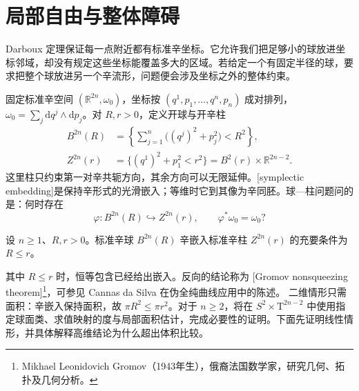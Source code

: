 
% 
% 
% 

\section{局部自由与整体障碍}
\label{g4:sec:0805}

Darboux 定理保证每一点附近都有标准辛坐标。它允许我们把足够小的球放进坐标邻域，却没有规定这些坐标能覆盖多大的区域。若给定一个有固定半径的球，要求把整个球放进另一个辛流形，问题便会涉及坐标之外的整体约束。

\ProseParagraphBreak

固定标准辛空间 \((\mathbb R^{2n},\omega_0)\)，坐标按 \((q^1,p_1,\ldots,q^n,p_n)\) 成对排列，\(\omega_0=\sum_j\mathrm{d}q^j\wedge\mathrm{d}p_j\)。对 \(R,r>0\)，定义开球与开辛柱
\begin{equation}\label{g4:eq:0805:ball-cylinder}
	\begin{aligned}
		B^{2n}(R)&=\left\{\sum_{j=1}^n\bigl((q^j)^2+p_j^2\bigr)<R^2\right\},\\
		Z^{2n}(r)&=\{(q^1)^2+p_1^2<r^2\}
		=B^2(r)\times\mathbb R^{2n-2}.
	\end{aligned}
\end{equation}
这里柱只约束第一对辛共轭方向，其余方向可以无限延伸。[symplectic embedding]是保持辛形式的光滑嵌入；等维时它到其像为辛同胚。球—柱问题问的是：何时存在
\[
	\varphi:B^{2n}(R)\hookrightarrow Z^{2n}(r),
	\qquad \varphi^*\omega_0=\omega_0?
\]

\begin{theorem}[非挤压定理]\label{g4:thm:0805:nonsqueezing-preview}
	设 \(n\ge1\)、\(R,r>0\)。标准辛球 \(B^{2n}(R)\) 辛嵌入标准辛柱 \(Z^{2n}(r)\) 的充要条件为 \(R\le r\)。
\end{theorem}

其中 \(R\le r\) 时，恒等包含已经给出嵌入。反向的结论称为 [Gromov nonsqueezing theorem]\footnote{Mikhael Leonidovich Gromov（1943年生），俄裔法国数学家，研究几何、拓扑及几何分析。}，可参见 Cannas da Silva 在伪全纯曲线应用中的陈述。\cite[第3.6节，第124页]{Cannas2006Symplectic} 二维情形只需面积：辛嵌入保持面积，故 \(\pi R^2\le\pi r^2\)。对于 \(n\ge2\)，将在 \(S^2\times\mathrm{T}^{2n-2}\) 中使用指定球面类、求值映射的度与局部面积估计，完成必要性的证明。下面先证明线性情形，并具体解释高维结论为什么超出体积比较。

